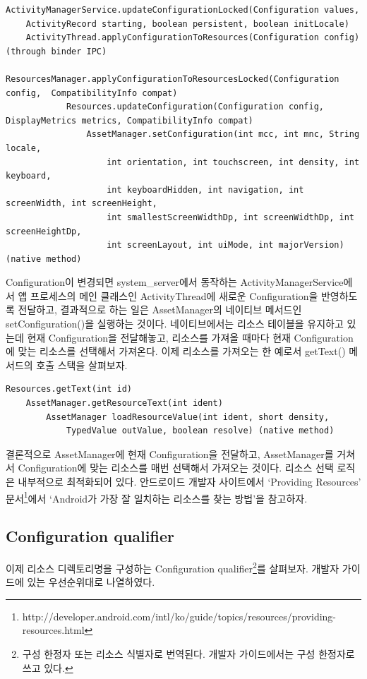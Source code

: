 \begin{lstlisting}[frame=single]
ActivityManagerService.updateConfigurationLocked(Configuration values,
	ActivityRecord starting, boolean persistent, boolean initLocale)
	ActivityThread.applyConfigurationToResources(Configuration config) (through binder IPC)
		ResourcesManager.applyConfigurationToResourcesLocked(Configuration config, 	CompatibilityInfo compat)
			Resources.updateConfiguration(Configuration config, DisplayMetrics metrics, CompatibilityInfo compat)
				AssetManager.setConfiguration(int mcc, int mnc, String locale,
            		int orientation, int touchscreen, int density, int keyboard,
            		int keyboardHidden, int navigation, int screenWidth, int screenHeight,
            		int smallestScreenWidthDp, int screenWidthDp, int screenHeightDp,
            		int screenLayout, int uiMode, int majorVersion) (native method)
\end{lstlisting}
\lstset{basicstyle=\ttfamily\small}
Configuration이 변경되면 system\_server에서 동작하는 ActivityManagerService에서 앱 프로세스의 메인 클래스인 ActivityThread에 새로운 Configuration을 반영하도록 전달하고, 결과적으로 하는 일은 AssetManager의 네이티브 메서드인 setConfiguration()을 실행하는 것이다. 네이티브에서는 리소스 테이블을 유지하고 있는데 현재 Configuration을 전달해놓고, 리소스를 가져올 때마다 현재 Configuration에 맞는 리소스를 선택해서 가져온다.
이제 리소스를 가져오는 한 예로서 getText() 메서드의 호출 스택을 살펴보자.
\begin{lstlisting}[frame=single]
Resources.getText(int id)
	AssetManager.getResourceText(int ident)
		AssetManager loadResourceValue(int ident, short density,
			TypedValue outValue, boolean resolve) (native method)
\end{lstlisting}
결론적으로 AssetManager에 현재 Configuration을 전달하고, AssetManager를 거쳐서 Configuration에 맞는 리소스를 매번 선택해서 가져오는 것이다. 리소스 선택 로직은 내부적으로 최적화되어 있다. 안드로이드 개발자 사이트에서 `Providing Resources' 문서\footnote{http://developer.android.com/intl/ko/guide/topics/resources/providing-resources.html}에서 `Android가 가장 잘 일치하는 리소스를 찾는 방법'을 참고하자.\\


\subsection{Configuration qualifier}
이제 리소스 디렉토리명을 구성하는 Configuration qualifier\footnote{구성 한정자 또는 리소스 식별자로 번역된다. 개발자 가이드에서는 구성 한정자로 쓰고 있다.}를 살펴보자. 개발자 가이드에 있는 우선순위대로 나열하였다.\\

